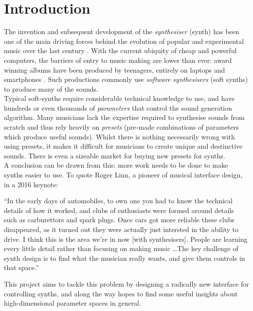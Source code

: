 \documentclass[11pt, oneside]{report}   	%
\begin{document}
\chapter{Introduction}
The invention and subsequent development of the \emph{synthesiser} (synth) has been one of the main driving forces behind the evolution of popular and experimental music over the last century \cite{Synth}. With the current ubiquity of cheap and powerful computers, the barriers of entry to music making are lower than ever: award winning albums have been produced by teenagers, entirely on laptops and smartphones \cite{IphoneProducer}. Such productions commonly use \emph{software synthesisers} (soft synths) to produce many of the sounds.\\
Typical soft-synths require considerable technical knowledge to use, and have hundreds or even thousands of \emph{parameters} that control the sound generation algorithm. Many musicians lack the expertise required to synthesise sounds from scratch and thus rely heavily on \emph{presets} (pre-made combinations of parameters which produce useful sounds). Whilst there is nothing necessarily wrong with using presets, it makes it difficult for musicians to create unique and destinctive sounds. There is even a sizeable market for buying new presets for synths.\\
A conclusion can be drawn from this: more work needs to be done to make synths easier to use. To quote Roger Linn, a pioneer of musical interface design, in a 2016 keynote: \cite{LinnKeynote}
\begin{displayquote}
	\singlespacing
	``In the early days of automobiles, to own one you had to know the technical details of how it worked, and clubs of enthusiasts were formed around details such as carburettors and spark plugs. Once cars got more reliable these clubs disappeared, as it turned out they were actually just intersted in the ability to drive. I think this is the area we're in now [with synthesisers]. People are learning every little detail rather than focusing on making music \dots The key challenge of synth design is to find what the musician really wants, and give them controls in that space.''
\end{displayquote}
This project aims to tackle this problem by designing a radically new interface for controlling synths, and along the way hopes to find some useful insights about high-dimensional parameter spaces in general.
%
\end{document}
